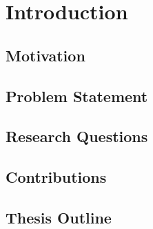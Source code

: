 \chapter{Introduction}\label{ch:intro}

\section{Motivation}

\section{Problem Statement}

\section{Research Questions}

\section{Contributions}

\section{Thesis Outline}
